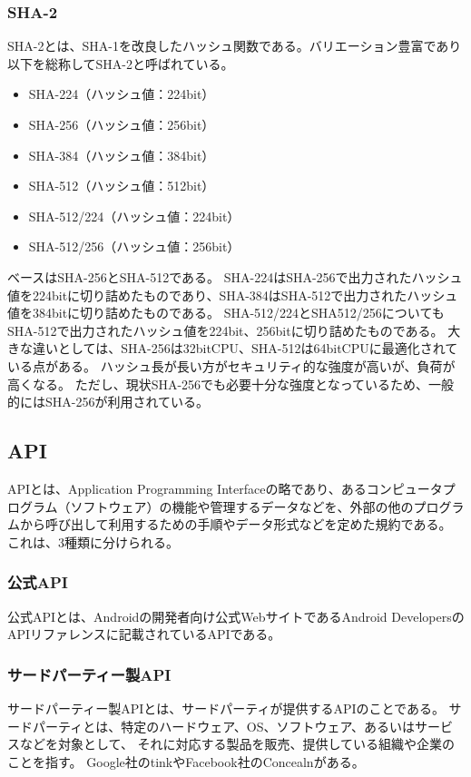 \subsubsection{SHA-2}
SHA-2とは、SHA-1を改良したハッシュ関数である。バリエーション豊富であり以下を総称してSHA-2と呼ばれている。
\begin{itemize}
\item SHA-224（ハッシュ値：224bit）
\item SHA-256（ハッシュ値：256bit）
\item SHA-384（ハッシュ値：384bit）
\item SHA-512（ハッシュ値：512bit）
\item SHA-512/224（ハッシュ値：224bit）
\item SHA-512/256（ハッシュ値：256bit）
\end{itemize}
ベースはSHA-256とSHA-512である。
SHA-224はSHA-256で出力されたハッシュ値を224bitに切り詰めたものであり、SHA-384はSHA-512で出力されたハッシュ値を384bitに切り詰めたものである。
SHA-512/224とSHA512/256についてもSHA-512で出力されたハッシュ値を224bit、256bitに切り詰めたものである。
大きな違いとしては、SHA-256は32bitCPU、SHA-512は64bitCPUに最適化されている点がある。
ハッシュ長が長い方がセキュリティ的な強度が高いが、負荷が高くなる。
ただし、現状SHA-256でも必要十分な強度となっているため、一般的にはSHA-256が利用されている。


\subsection{API}
APIとは、Application Programming Interfaceの略であり、あるコンピュータプログラム（ソフトウェア）の機能や管理するデータなどを、外部の他のプログラムから呼び出して利用するための手順やデータ形式などを定めた規約である。
これは、3種類に分けられる。

\subsubsection {公式API}
公式APIとは、Androidの開発者向け公式WebサイトであるAndroid DevelopersのAPIリファレンスに記載されているAPIである。

\subsubsection {サードパーティー製API}
サードパーティー製APIとは、サードパーティが提供するAPIのことである。
サードパーティとは、特定のハードウェア、OS、ソフトウェア、あるいはサービスなどを対象として、
それに対応する製品を販売、提供している組織や企業のことを指す。
Google社のtinkやFacebook社のConcealnがある。

